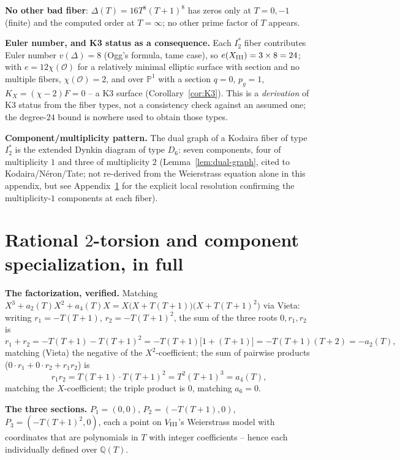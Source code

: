 \documentclass[11pt]{amsart}
\theoremstyle{definition}
\newcommand{\Q}{\mathbb{Q}}
\begin{document}
\textbf{No other bad fiber}: $\Delta(T)=16T^8(T+1)^8$ has zeros only at
$T=0,-1$ (finite) and the computed order at $T=\infty$; no other prime
factor of $T$ appears.

\textbf{Euler number, and K3 status as a consequence.} Each $I_2^*$ fiber
contributes Euler number $v(\Delta)=8$ (Ogg's formula, tame case), so
$e(X_{\rm III})=3\times8=24$; with $e=12\chi(\mathcal O)$ for a
relatively minimal elliptic surface with section and no multiple fibers,
$\chi(\mathcal O)=2$, and over $\mathbb P^1$ with a section $q=0$,
$p_g=1$, $K_X=(\chi-2)F=0$ -- a K3 surface
(Corollary~\ref{cor:K3}). This is a \emph{derivation} of K3 status from
the fiber types, not a consistency check against an assumed one; the
degree-$24$ bound is nowhere used to obtain those types.

\textbf{Component/multiplicity pattern.} The dual graph of a Kodaira
fiber of type $I_2^*$ is the extended Dynkin diagram of type $D_6$: seven
components, four of multiplicity $1$ and three of multiplicity $2$
(Lemma~\ref{lem:dual-graph}, cited to Kodaira/N\'eron/Tate; not re-derived
from the Weierstrass equation alone in this appendix, but see
Appendix~\ref{app:C} for the explicit local resolution confirming the
multiplicity-$1$ components at each fiber).

\section{Rational $2$-torsion and component specialization, in full}
\label{app:C}

\textbf{The factorization, verified.} Matching
$X^3+a_2(T)X^2+a_4(T)X = X\bigl(X+T(T+1)\bigr)\bigl(X+T(T+1)^2\bigr)$
via Vieta: writing $r_1=-T(T+1)$, $r_2=-T(T+1)^2$, the sum of the three
roots $0,r_1,r_2$ is
\[
r_1+r_2 = -T(T+1)-T(T+1)^2 = -T(T+1)\bigl[1+(T+1)\bigr] = -T(T+1)(T+2) = -a_2(T),
\]
matching (Vieta) the negative of the $X^2$-coefficient; the sum of
pairwise products ($0\cdot r_1+0\cdot r_2+r_1r_2$) is
\[
r_1r_2 = T(T+1)\cdot T(T+1)^2 = T^2(T+1)^3 = a_4(T),
\]
matching the $X$-coefficient; the triple product is $0$, matching $a_6=0$.

\textbf{The three sections.} $P_1=(0,0)$, $P_2=(-T(T+1),0)$,
$P_3=(-T(T+1)^2,0)$, each a point on $V_{\rm III}$'s Weierstrass model with
coordinates that are polynomials in $T$ with integer coefficients -- hence
each individually defined over $\Q(T)$.
\end{document}
